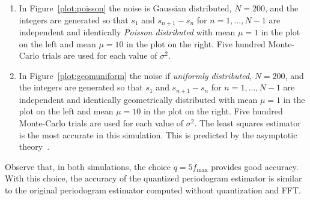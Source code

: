 \documentclass[a4paper,10pt]{article}
\begin{document}
\begin{enumerate}
\begin{enumerate}
\item In Figure~\ref{plot:poisson} the noise is Gaussian distributed, $N=200$, and the integers are generated so that $s_1$ and $s_{n+1} - s_n$ for $n=1,\dots,N-1$ are independent and identically \emph{Poisson distributed} with mean $\mu = 1$ in the plot on the left and mean $\mu=10$ in the plot on the right.  Five hundred Monte-Carlo trials are used for each value of $\sigma^2$.
\item In Figure~\ref{plot:geomuniform} the noise if \emph{uniformly distributed}, $N=200$, and the integers are generated so that $s_1$ and $s_{n+1} - s_n$ for $n=1,\dots,N-1$ are independent and identically geometrically distributed with mean $\mu = 1$ in the plot on the left and mean $\mu=10$ in the plot on the right.  Five hundred Monte-Carlo trials are used for each value of $\sigma^2$.   The least squares estimator is the most accurate in this simulation. This is predicted by the asymptotic theory~\cite{Quinn_sparse_noisy_SSP_2012,Quinn20013asilomar_period_est}.
\end{enumerate}

Observe that, in both simulations, the choice $q=5 f_{\text{max}}$ provides good accuracy. With this choice, the accuracy of the quantized periodogram estimator is similar to the original periodogram estimator computed without quantization and FFT.  %



\end{enumerate}
\end{document}
